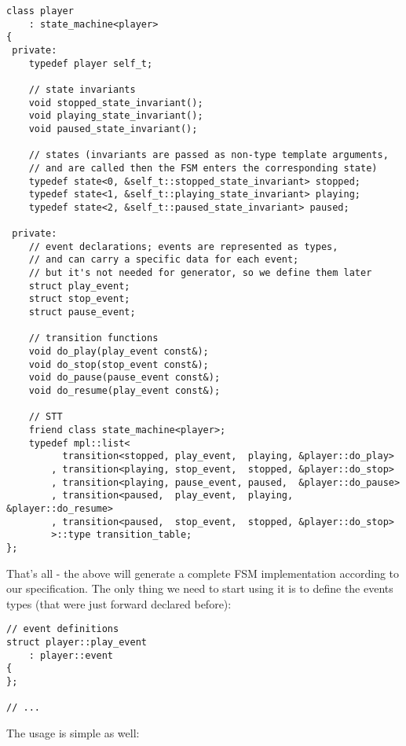 \documentclass{kapproc}
\begin{document}
{\small
\begin{codesamp}\begin{verbatim}
class player
    : state_machine<player>
{
 private:
    typedef player self_t;

    // state invariants
    void stopped_state_invariant();
    void playing_state_invariant();
    void paused_state_invariant();

    // states (invariants are passed as non-type template arguments,
    // and are called then the FSM enters the corresponding state)
    typedef state<0, &self_t::stopped_state_invariant> stopped;
    typedef state<1, &self_t::playing_state_invariant> playing;
    typedef state<2, &self_t::paused_state_invariant> paused;

 private:
    // event declarations; events are represented as types, 
    // and can carry a specific data for each event;
    // but it's not needed for generator, so we define them later
    struct play_event;
    struct stop_event;
    struct pause_event;

    // transition functions
    void do_play(play_event const&);
    void do_stop(stop_event const&);
    void do_pause(pause_event const&);
    void do_resume(play_event const&);

    // STT
    friend class state_machine<player>;
    typedef mpl::list<
          transition<stopped, play_event,  playing, &player::do_play>
        , transition<playing, stop_event,  stopped, &player::do_stop>
        , transition<playing, pause_event, paused,  &player::do_pause>
        , transition<paused,  play_event,  playing, &player::do_resume>
        , transition<paused,  stop_event,  stopped, &player::do_stop>
        >::type transition_table;
};
\end{verbatim}
\end{codesamp}
}

That's all - the above will generate a complete FSM 
implementation according to our specification. The only thing we 
need to start using it is to define the events types (that were 
just forward declared before):

{\small
\begin{codesamp}\begin{verbatim}
// event definitions
struct player::play_event
    : player::event
{
};

// ...
\end{verbatim}
\end{codesamp}
}

The usage is simple as well:
\end{document}
